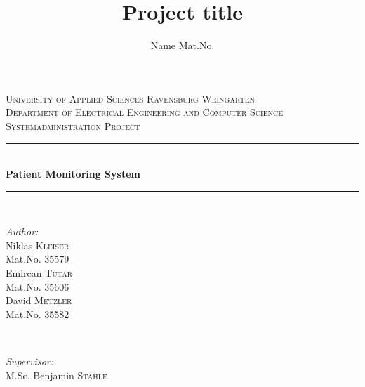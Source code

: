 \documentclass[a4paper,11pt,singlespacing]{article}
\title{Project title}
\author{
	Name Mat.No.
	}
\begin{document}
\setlength{\parindent}{0ex}

\begin{titlepage}
	
	\newcommand{\HRule}{\rule{\linewidth}{0.5mm}} %
	
	\center %
	
	
	\textsc{\LARGE University of Applied Sciences Ravensburg Weingarten}\\[1.5cm] %
	\textsc{\Large Department of
		Electrical Engineering
		and Computer Science}\\[0.5cm] %
	\textsc{\large Systemadministration Project}\\[0.5cm] %
	
	
	\HRule \\[0.4cm]
	{ \huge \bfseries Patient Monitoring System}\\[0.4cm] %
	\HRule \\[1.5cm]
	
	
	\begin{minipage}{0.4\textwidth}
		\begin{flushleft} \large
			\emph{Author:}\\
			Niklas \textsc{Kleiser}\\ %
			Mat.No. 35579 \\
            Emircan \textsc{Tutar}\\ %
			Mat.No. 35606 \\
            David \textsc{Metzler}\\ %
			Mat.No. 35582
		\end{flushleft}
	\end{minipage}
	~
	\begin{minipage}{0.4\textwidth}
		\begin{flushright} \large
			\emph{Supervisor:} \\
			M.Sc. Benjamin \textsc{Stähle} %
		\end{flushright}
	\end{minipage}\\[2cm]
	

\end{titlepage}
\end{document}
